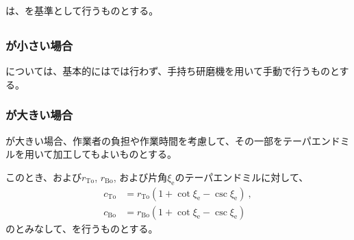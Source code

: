\subsubsection{\EndFaceInRChamferMilling}
\EndFaceInRChamferMillingReferencePoint は、\EndFaceIDCenter を基準として行うものとする。


\subsection{\EndFaceOutRChamferMilling}

\subsubsection{\EndFaceOutRChamferRadius が小さい場合}
\EndFaceOutRChamfer については、基本的には\MMC では行わず、手持ち研磨機を用いて手動で行うものとする。

\subsubsection{\EndFaceOutRChamferRadius が大きい場合}
\EndFaceOutRChamferRadius が大きい場合、作業者の負担や作業時間を考慮して、その一部をテーパエンドミルを用いて加工してもよいものとする。

このとき、\TopEndFaceOutRChamferRadius および\BottomEndFaceOutRChamferRadius$r_\mathrm{To}$, $r_\mathrm{Bo}$, および片角$\xi_\mathrm e$のテーパエンドミルに対して、
\begin{align*}
  c_\mathrm{To} &= r_\mathrm{To}\left(1+\cot\xi_\mathrm e-\csc\xi_\mathrm e\right)\ ,\\
  c_\mathrm{Bo} &= r_\mathrm{Bo}\left(1+\cot\xi_\mathrm e-\csc\xi_\mathrm e\right)
\end{align*}
の\EndFaceOutCChamferLength とみなして、\EndFaceInCChamferMilling を行うものとする。


